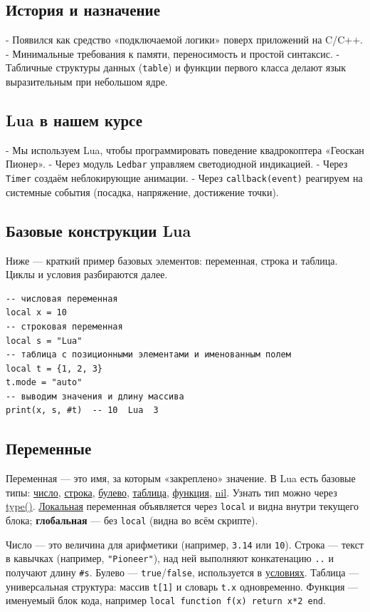 \subsection{История и назначение}
- Появился как средство «подключаемой логики» поверх приложений на C/C++.
- Минимальные требования к памяти, переносимость и простой синтаксис.
- Табличные структуры данных (\verb|table|) и функции первого класса делают язык выразительным при небольшом ядре.

\subsection{Lua в нашем курсе}
- Мы используем Lua, чтобы программировать поведение квадрокоптера «Геоскан Пионер».
- Через модуль \verb|Ledbar| управляем светодиодной индикацией.
- Через \verb|Timer| создаём неблокирующие анимации.
- Через \verb|callback(event)| реагируем на системные события (посадка, напряжение, достижение точки).

\subsection{Базовые конструкции Lua}
Ниже — краткий пример базовых элементов: переменная, строка и таблица. Циклы и условия разбираются далее.
\begin{verbatim}
-- числовая переменная
local x = 10
-- строковая переменная
local s = "Lua"
-- таблица с позиционными элементами и именованным полем
local t = {1, 2, 3}
t.mode = "auto"
-- выводим значения и длину массива
print(x, s, #t)  -- 10  Lua  3
\end{verbatim}

\subsection{Переменные}
Переменная — это имя, за которым «закреплено» значение. В Lua есть базовые типы: \hyperlink{term:number}{число}, \hyperlink{term:string}{строка}, \hyperlink{term:boolean}{булево}, \hyperlink{term:table}{таблица}, \hyperlink{term:function}{функция}, \hyperlink{term:nil}{nil}. Узнать тип можно через \hyperlink{term:type}{type()}. \hyperlink{term:scope}{Локальная} переменная объявляется через \verb|local| и видна внутри текущего блока; \textbf{глобальная} — без \verb|local| (видна во всём скрипте).

Число — это величина для арифметики (например, \verb|3.14| или \verb|10|). Строка — текст в кавычках (например, \verb|"Pioneer"|), над ней выполняют конкатенацию \verb|..| и получают длину \verb|#s|. Булево — \verb|true|/\verb|false|, используется в \hyperlink{term:condition}{условиях}. Таблица — универсальная структура: массив \verb|t[1]| и словарь \verb|t.x| одновременно. Функция — именуемый блок кода, например \verb|local function f(x) return x*2 end|.

